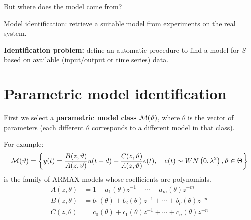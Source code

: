 But where does the model come from?

Model identification: retrieve a suitable model from experiments on the real system.


\textbf{Identification problem:} define an automatic procedure to find a model for $S$ based on available (input/output or time series) data.

\begin{figure}[htpb]
	\centering
\end{figure}
\FloatBarrier

\section{Parametric model identification}

First we select a \textbf{parametric model class} $\mathcal{M}(\vartheta)$, where $\theta$ is the vector of parameters (each different $\theta$ corresponds to a different model in that class).

For example:
$$
	\mathcal{M}(\vartheta)=\left\{y(t)=\frac{B(z, \vartheta)}{A(z, \vartheta)} u(t-d)+\frac{C(z, \vartheta)}{A(z, \vartheta)} e(t), \quad e(t) \sim WN\left(0, \lambda^{2}\right), \vartheta\in\Theta\right\}
$$
is the family of ARMAX models whose coefficients are polynomials.
\begin{align*}
	A(z, \theta)&=1-a_{1}(\theta) z^{-1}-\cdots-a_{m}(\theta) z^{-m} \\
	B(z, \theta)&=b_{1}(\theta)+b_{2}(\theta) z^{-1}+\cdots+b_{p}(\theta) z^{-p}\\
	C(z, \theta)&=c_0(\theta)+c_{1}(\theta) z^{-1}+\cdots+c_{n}(\theta) z^{-n}
\end{align*}

